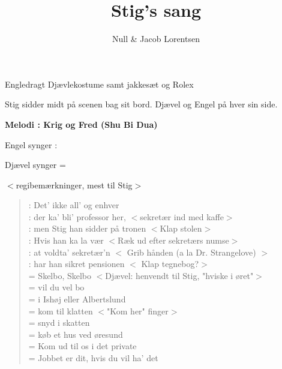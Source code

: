 \documentclass[a4paper,11pt]{article}
\begin{document}
\title{Stig's sang}

\author{Null \& Jacob Lorentsen}


\maketitle

\begin{roles}


Engledragt
Djævlekostume samt jakkesæt og Rolex
\end{roles}

\begin{sketch}

\scene
Stig sidder midt på scenen bag sit bord. Djævel og Engel på
hver sin side.

\begin{center}
{\bf Melodi : Krig og Fred (Shu Bi Dua)}
\end{center}

Engel synger :

Djævel synger =

$<$regibemærkninger, mest til Stig$>$

{\rm 
\begin{verse}
: Det' ikke all' og enhver\\
: der ka' bli' professor her, $<$sekretær ind med kaffe$>$\\
: men Stig han sidder på tronen $<$Klap stolen$>$\\
: Hvis han ka la vær $<$Ræk ud efter sekretærs numse$>$\\
: at voldta' sekretær'n $<$ Grib hånden (a la Dr. Strangelove) $>$\\
: har han sikret pensionen $<$ Klap tegnebog?$>$\\
= Skelbo, Skelbo $<$Djævel: henvendt til Stig, "hviske i øret"$>$\\
= vil du vel bo\\
= i Ishøj eller Albertslund\\
= kom til klatten $<$"Kom her" finger$>$\\
= snyd i skatten\\
= køb et hus ved øresund\\
= Kom ud til os i det private\\
= Jobbet er dit, hvis du vil ha' det\\
\end{verse}

}
\end{sketch}
\end{document}
